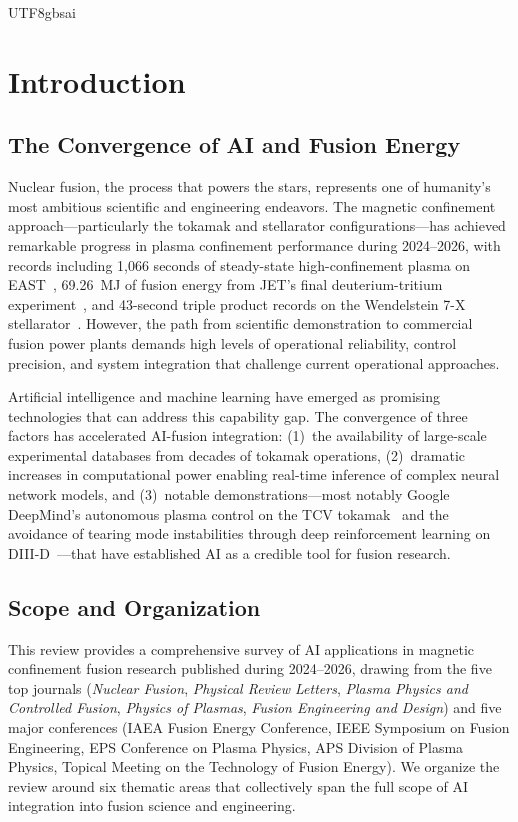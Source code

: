 \documentclass[12pt,a4paper]{article}
\begin{document}
\begin{CJK}{UTF8}{gbsai}
\section{Introduction}

\subsection{The Convergence of AI and Fusion Energy}

Nuclear fusion, the process that powers the stars, represents one of humanity's most ambitious scientific and engineering endeavors. The magnetic confinement approach---particularly the tokamak and stellarator configurations---has achieved remarkable progress in plasma confinement performance during 2024--2026, with records including 1,066 seconds of steady-state high-confinement plasma on EAST~\citep{Wan2025EAST}, 69.26~MJ of fusion energy from JET's final deuterium-tritium experiment~\citep{Kappatou2024JET}, and 43-second triple product records on the Wendelstein 7-X stellarator~\citep{Klinger2025W7X}. However, the path from scientific demonstration to commercial fusion power plants demands high levels of operational reliability, control precision, and system integration that challenge current operational approaches.

Artificial intelligence and machine learning have emerged as promising technologies that can address this capability gap. The convergence of three factors has accelerated AI-fusion integration: (1)~the availability of large-scale experimental databases from decades of tokamak operations, (2)~dramatic increases in computational power enabling real-time inference of complex neural network models, and (3)~notable demonstrations---most notably Google DeepMind's autonomous plasma control on the TCV tokamak~\citep{Degrave2022Nature} and the avoidance of tearing mode instabilities through deep reinforcement learning on DIII-D~\citep{Seo2024Nature}---that have established AI as a credible tool for fusion research.

\subsection{Scope and Organization}

This review provides a comprehensive survey of AI applications in magnetic confinement fusion research published during 2024--2026, drawing from the five top journals (\textit{Nuclear Fusion}, \textit{Physical Review Letters}, \textit{Plasma Physics and Controlled Fusion}, \textit{Physics of Plasmas}, \textit{Fusion Engineering and Design}) and five major conferences (IAEA Fusion Energy Conference, IEEE Symposium on Fusion Engineering, EPS Conference on Plasma Physics, APS Division of Plasma Physics, Topical Meeting on the Technology of Fusion Energy). We organize the review around six thematic areas that collectively span the full scope of AI integration into fusion science and engineering.


\end{CJK}
\end{document}
